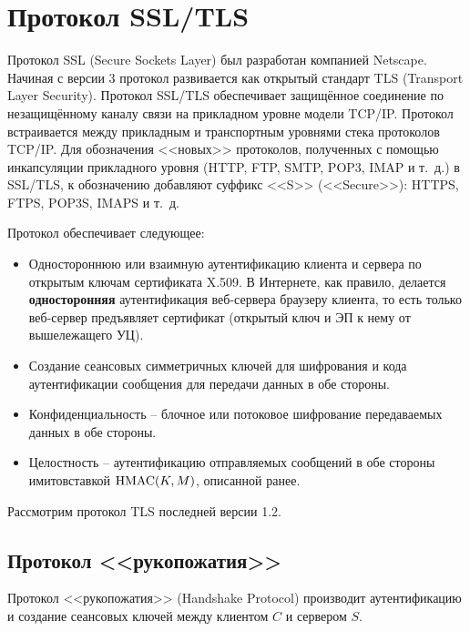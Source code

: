 \section{Протокол SSL/TLS}

Протокол SSL (Secure Sockets Layer) был разработан компанией Netscape. Начиная с версии 3 протокол развивается как открытый стандарт TLS (Transport Layer Security). Протокол SSL/TLS обеспечивает защищённое соединение по незащищённому каналу связи на прикладном уровне модели TCP/IP. Протокол встраивается между прикладным и транспортным уровнями стека протоколов TCP/IP. Для обозначения <<новых>> протоколов, полученных с помощью инкапсуляции прикладного уровня (HTTP, FTP, SMTP, POP3, IMAP и т.~д.) в SSL/TLS, к обозначению добавляют суффикс <<S>> (<<Secure>>): HTTPS, FTPS, POP3S, IMAPS и т.~д.

Протокол обеспечивает следующее:
\begin{itemize}
    \item Одностороннюю или взаимную аутентификацию клиента и сервера по открытым ключам сертификата X.509. В Интернете, как правило, делается \textbf{односторонняя} аутентификация веб-сервера браузеру клиента, то есть только веб-сервер предъявляет сертификат (открытый ключ и ЭП к нему от вышележащего УЦ).
    \item Создание сеансовых симметричных ключей для шифрования и кода аутентификации сообщения для передачи данных в обе стороны.
    \item Конфиденциальность -- блочное или потоковое шифрование передаваемых данных в обе стороны.
    \item Целостность -- аутентификацию отправляемых сообщений в обе стороны имитовставкой $\textrm{HMAC}(K,M)$, описанной ранее.
\end{itemize}

Рассмотрим протокол TLS последней версии 1.2.


\subsection{Протокол <<рукопожатия>>}

Протокол <<рукопожатия>> (Handshake Protocol) производит аутентификацию и создание сеансовых ключей между клиентом $C$ и сервером $S$.

